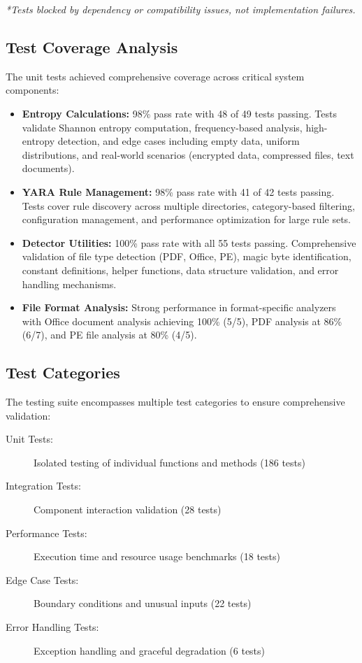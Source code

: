 \noindent\textit{*Tests blocked by dependency or compatibility issues, not implementation failures.}

\subsection{Test Coverage Analysis}

The unit tests achieved comprehensive coverage across critical system components:

\begin{itemize}
    \item \textbf{Entropy Calculations:} 98\% pass rate with 48 of 49 tests passing. Tests validate Shannon entropy computation, frequency-based analysis, high-entropy detection, and edge cases including empty data, uniform distributions, and real-world scenarios (encrypted data, compressed files, text documents).
    
    \item \textbf{YARA Rule Management:} 98\% pass rate with 41 of 42 tests passing. Tests cover rule discovery across multiple directories, category-based filtering, configuration management, and performance optimization for large rule sets.
    
    \item \textbf{Detector Utilities:} 100\% pass rate with all 55 tests passing. Comprehensive validation of file type detection (PDF, Office, PE), magic byte identification, constant definitions, helper functions, data structure validation, and error handling mechanisms.
    
    \item \textbf{File Format Analysis:} Strong performance in format-specific analyzers with Office document analysis achieving 100\% (5/5), PDF analysis at 86\% (6/7), and PE file analysis at 80\% (4/5).
\end{itemize}

\subsection{Test Categories}

The testing suite encompasses multiple test categories to ensure comprehensive validation:

\begin{description}
    \item[Unit Tests:] Isolated testing of individual functions and methods (186 tests)
    \item[Integration Tests:] Component interaction validation (28 tests)
    \item[Performance Tests:] Execution time and resource usage benchmarks (18 tests)
    \item[Edge Case Tests:] Boundary conditions and unusual inputs (22 tests)
    \item[Error Handling Tests:] Exception handling and graceful degradation (6 tests)
\end{description}


